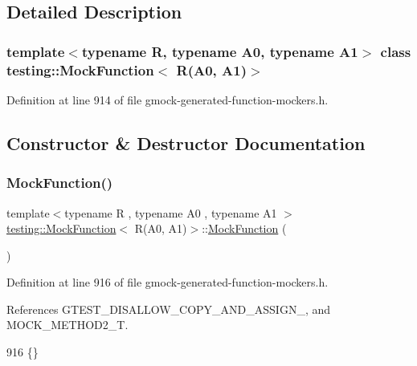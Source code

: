 \subsection{Detailed Description}
\subsubsection*{template$<$typename R, typename A0, typename A1$>$\newline
class testing\+::\+Mock\+Function$<$ R(\+A0, A1)$>$}



Definition at line 914 of file gmock-\/generated-\/function-\/mockers.\+h.



\subsection{Constructor \& Destructor Documentation}
\mbox{\label{classtesting_1_1MockFunction_3_01R_07A0_00_01A1_08_4_a6a2575d43e9ec4f5d51cd53edbec7f82}} 
\subsubsection{\texorpdfstring{Mock\+Function()}{MockFunction()}}
{\footnotesize\ttfamily template$<$typename R , typename A0 , typename A1 $>$ \\
\hyperlink{classtesting_1_1MockFunction}{testing\+::\+Mock\+Function}$<$ R(A0, A1)$>$\+::\hyperlink{classtesting_1_1MockFunction}{Mock\+Function} (\begin{DoxyParamCaption}{ }\end{DoxyParamCaption})\hspace{0.3cm}{\ttfamily [inline]}}



Definition at line 916 of file gmock-\/generated-\/function-\/mockers.\+h.



References G\+T\+E\+S\+T\+\_\+\+D\+I\+S\+A\+L\+L\+O\+W\+\_\+\+C\+O\+P\+Y\+\_\+\+A\+N\+D\+\_\+\+A\+S\+S\+I\+G\+N\+\_\+, and M\+O\+C\+K\+\_\+\+M\+E\+T\+H\+O\+D2\+\_\+T.


\begin{DoxyCode}
916 \{\}
\end{DoxyCode}


